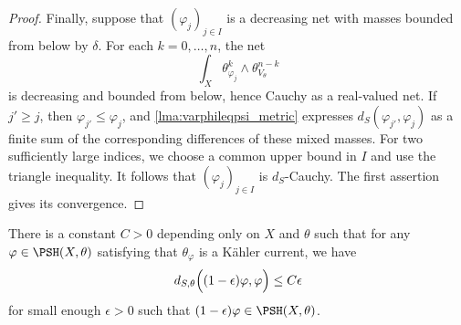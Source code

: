 \begin{proof}
    Finally, suppose that $(\varphi_j)_{j\in I}$ is a decreasing net with masses bounded from below by $\delta$. For each $k=0,\ldots,n$, the net
    \[
        \int_X\theta_{\varphi_j}^k\wedge\theta_{V_\theta}^{n-k}
    \]
    is decreasing and bounded from below, hence Cauchy as a real-valued net. If $j'\geq j$, then $\varphi_{j'}\leq\varphi_j$, and \cref{lma:varphileqpsi_metric} expresses $d_S(\varphi_{j'},\varphi_j)$ as a finite sum of the corresponding differences of these mixed masses. For two sufficiently large indices, we choose a common upper bound in $I$ and use the triangle inequality. It follows that $(\varphi_j)_{j\in I}$ is $d_S$-Cauchy. The first assertion gives its convergence.
\end{proof}

\begin{lemma}\label{lma:dSsmallmult}
    There is a constant $C>0$ depending only on $X$ and $\theta$ such that for any $\varphi\in \PSH(X,\theta)$ satisfying that $\theta_{\varphi}$ is a Kähler current, we have
        \[
        d_{S,\theta}\Bigl((1-\epsilon)\varphi,\varphi\Bigr)\leq C \epsilon
        \]
        for small enough $\epsilon>0$ such that $(1-\epsilon)\varphi\in \PSH(X,\theta)$.
    \end{lemma}
